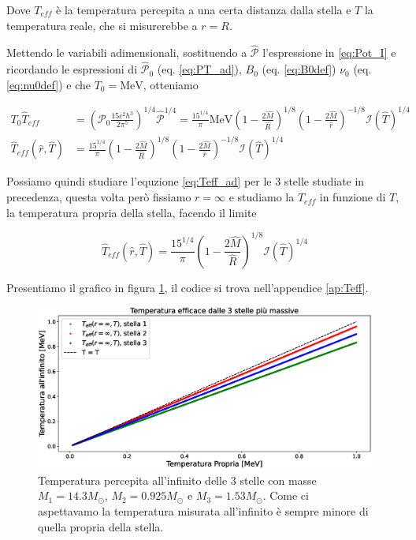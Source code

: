 \documentclass[a4paper, titlepage]{article}
\begin{document}
Dove $T_{eff}$ è la temperatura percepita a una certa distanza dalla stella e $T$ la temperatura reale, che si misurerebbe a $r = R$.

Mettendo le variabili adimensionali, sostituendo a $\mathcal{\hat P}$ l'espressione in \ref{eq:Pot_I} e ricordando le espressioni di $\mathcal{\hat P}_0$ (eq. \ref{eq:PT_ad}), $B_0$ (eq. \ref{eq:B0def}) $\nu_0$ (eq. \ref{eq:nu0def}) e che $T_0 = \unit{\mega\electronvolt}$, otteniamo

\begin{align}
    T_0 \hat T_{eff} &= \left( \mathcal P_0 \frac{15 c^2 h^3}{2 \pi^5} \right)^{1/4} \mathcal{\hat P}^{1/4}
    = \frac{15^{1/4}}{\pi} \unit{\mega\electronvolt} \left(1 - \frac{2 \hat M}{\hat R} \right)^{1/8} \left(1 - \frac{2 \hat M}{\hat r} \right)^{-1/8} \mathcal{I} (\hat T)^{1/4} \\
    \hat T_{eff}(\hat r, \hat T) &= \frac{15^{1/4}}{\pi} \left(1 - \frac{2 \hat M}{\hat R} \right)^{1/8} \left(1 - \frac{2 \hat M}{\hat r} \right)^{-1/8} \mathcal{I} (\hat T)^{1/4}
    \label{eq:Teff_ad}
\end{align}

Possiamo quindi studiare l'equzione \ref{eq:Teff_ad} per le 3 stelle studiate in precedenza, questa volta però fissiamo $r = \infty$ e studiamo la $T_{eff}$ in funzione di $T$, la temperatura propria della stella, facendo il limite

\begin{equation}
    \hat T_{eff}(\hat r, \hat T) = \frac{15^{1/4}}{\pi} \left(1 - \frac{2 \hat M}{\hat R} \right)^{1/8} \mathcal{I} (\hat T)^{1/4}
\end{equation}

Presentiamo il grafico in figura \ref{fig:Teff}, il codice si trova nell'appendice \ref{ap:Teff}.

\begin{figure}[h]
    \centering
    \includegraphics[width = \textwidth]{Figures/Teff.eps}
    \caption{Temperatura percepita all'infinito delle 3 stelle con masse $M_1 = 14.3 M_\odot$, $M_2 = 0.925 M_\odot$ e $M_3 = 1.53 M_\odot$. Come ci aspettavamo la temperatura misurata all'infinito è sempre minore di quella propria della stella.}
    \label{fig:Teff}
\end{figure}
\end{document}
